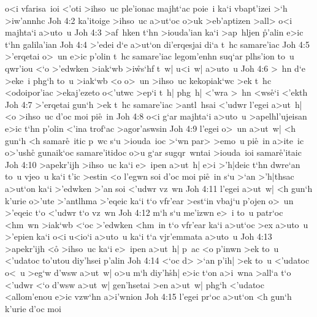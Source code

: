 o<i
vfarisa~ioi
<'oti
>ihso~uc
ple'ionac
majht`ac
poie~i
ka`i
vbapt'izei
>`h
>iw'annhc\bibvsend
\vs Joh 4:2
ka'itoige
>ihso~uc
a>ut`oc
o>uk
>eb'aptizen
>all>
o<i
majhta`i
a>uto~u\bibvsend
\vs Joh 4:3
>af~hken
t`hn
>iouda'ian
ka`i
>ap~hljen
\r{p}'alin
e>ic
t`hn
galila'ian\bibvsend
\vs Joh 4:4
>'edei
d`e
a>ut`on
di'erqesjai
di`a
t~hc
samare'iac\bibvsend
\vs Joh 4:5
>'erqetai
o>~un
e>ic
p'olin
t~hc
samare'iac
legom'enhn
suq`ar
plhs'ion
to~u
qwr'iou
<`o
>'edwken
>iak`wb
>i\r{w}s`hf
t~w|
u<i~w|
a>uto~u\bibvsend
\vs Joh 4:6
>~hn
d`e
>eke~i
phg`h
to~u
>iak`wb
<o
o>~un
>ihso~uc
kekopiak`wc
>ek
t~hc
<odoipor'iac
>ekaj'ezeto
o<'utwc
>ep`i
t~h|
phg~h|
<'wra
>~hn
<ws\r{e}`i
<'ekth\bibvsend
\vs Joh 4:7
>'erqetai
gun`h
>ek
t~hc
samare'iac
>antl~hsai
<'udwr
l'egei
a>ut~h|
<o
>ihso~uc
d'oc
moi
pi\r{e}~in\bibvsend
{}
\vs Joh 4:8
o<i
g`ar
majhta`i
a>uto~u
>apelhl'ujeisan
e>ic
t`hn
p'olin
<'ina
trof`ac
>agor'aswsin\bibvsend
\vs Joh 4:9
l'egei
o>~un
a>ut~w|
<h
gun`h
<h
samar\r{e}~itic
p~wc
s`u
>iouda~ioc
>`wn
par>
>emo~u
pi\r{e}~in
a>ite~ic
o>'ushc\r{}
gunaik`oc
samare'itidoc
o>u
g`ar
sugqr~wntai
>iouda~ioi
samar\r{e}'itaic\bibvsend
{}
\vs Joh 4:10
>apekr'ijh
>ihso~uc
ka`i
e>~ipen
a>ut~h|
e>i
>'h|deic
t`hn
dwre`an
to~u
vjeo~u
ka`i
t'ic
>estin
<o
l'egwn
soi
d'oc
moi
pi\r{e}~in
s`u
>`an
>'h|thsac
a>ut`on
ka`i
>'edwken
>'an
soi
<'udwr
vz~wn\bibvsend
\vs Joh 4:11
l'egei
a>ut~w|
<h
gun`h
k'urie
o>'ute
>'antlhma
>'eqeic
ka`i
t`o
vfr'ear
>est`in
vbaj`u
p'ojen
o>~un
>'eqeic
t`o
<'udwr
t`o
vz~wn\bibvsend
\vs Joh 4:12
m`h
s`u
me'izwn
e>~i
to~u
patr`oc
<hm~wn
>iak`wb
<`oc
>'edwken
<hm~in
t`o
vfr'ear
ka`i
a>ut`oc
>ex
a>uto~u
>'epien
ka`i
o<i
u<io`i
a>uto~u
ka`i
t`a
vjr'emmata
a>uto~u\bibvsend
\vs Joh 4:13
>apekr'ijh
<o\r{}
>ihso~uc
ka`i
e>~ipen
a>ut~h|
p~ac
<o
p'inwn
>ek
to~u
<'udatoc
to'utou
diy'hsei
p'alin\bibvsend
\vs Joh 4:14
<`oc
d>
>`an
p'ih|
>ek
to~u
<'udatoc
o<~u
>eg`w
d'wsw
a>ut~w|
o>u
m`h
diy'h\r{s}h|
e>ic
t`on
a>i~wna
>all`a
t`o
<'udwr
<`o
d'wsw
a>ut~w|
gen'hsetai
>en
a>ut~w|
phg`h
<'udatoc
<allom'enou
e>ic
vzw`hn
a>i'wnion\bibvsend
\vs Joh 4:15
l'egei
pr`oc
a>ut`on
<h
gun`h
k'urie
d'oc
moi
